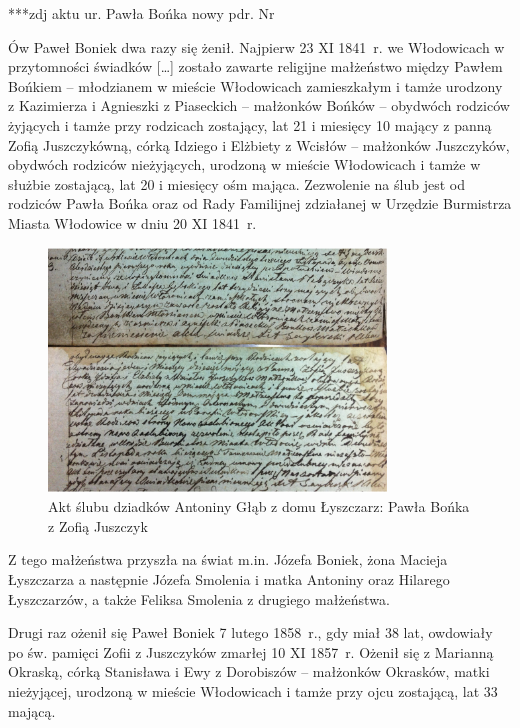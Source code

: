 {\color{red}
***zdj aktu ur. Pawła Bońka  nowy pdr. Nr }

Ów Paweł Boniek dwa razy się żenił. Najpierw 23 XI 1841~r. we Włodowicach w przytomności świadków […] zostało zawarte religijne małżeństwo między Pawłem Bońkiem -- młodzianem w mieście Włodowicach zamieszkałym i tamże urodzony z Kazimierza i Agnieszki z Piaseckich -- małżonków Bońków -- obydwóch rodziców żyjących i tamże przy rodzicach zostający, lat 21 i miesięcy 10 mający z panną Zofią Juszczykówną, córką Idziego i Elżbiety z Wcisłów -- małżonków Juszczyków, obydwóch rodziców nieżyjących, urodzoną w mieście Włodowicach i tamże w służbie zostającą, lat 20 i miesięcy ośm mająca. Zezwolenie na ślub jest od rodziców Pawła Bońka oraz od Rady Familijnej zdziałanej w Urzędzie Burmistrza Miasta Włodowice w dniu 20 XI 1841~r.

\begin{figure}[!h]
\begin{center}
\includegraphics[width=0.8\textwidth]{zdjecia/akt_slubu_pawla_bonka_i_zofii_juszczyk.jpg}
\caption[Akt ślubu Pawła Bońka z Zofią Juszczyk]{Akt ślubu dziadków Antoniny Głąb z domu Łyszczarz: Pawła Bońka z Zofią Juszczyk}
\label{rys:akt_slubu_pawla_bonka_i_zofii_juszczyk}
\end{center}
\end{figure}

Z tego małżeństwa przyszła na świat m.in. Józefa Boniek, żona Macieja Łyszczarza a następnie Józefa Smolenia i matka Antoniny oraz Hilarego Łyszczarzów, a także Feliksa Smolenia z drugiego małżeństwa.

Drugi raz ożenił się Paweł Boniek 7 lutego 1858~r., gdy miał 38 lat, owdowiały po św. pamięci Zofii z Juszczyków zmarłej 10 XI 1857~r. Ożenił się z Marianną Okraską, córką Stanisława i Ewy z Dorobiszów – małżonków Okrasków, matki nieżyjącej, urodzoną w mieście Włodowicach i tamże przy ojcu zostającą, lat 33 mającą. 

